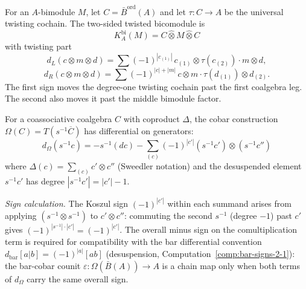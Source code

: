 \begin{computation}
\label{comp:two-sided-twisting-signs}
For an $A$-bimodule $M$, let $C=\bar B^{\mathrm{ord}}(A)$ and let
$\tau:C\to A$ be the universal twisting cochain. The two-sided twisted
bicomodule is
\[
K_A^{\mathrm{bi}}(M)=C\widehat\otimes M\widehat\otimes C
\]
with twisting part
\[
d_L(c\otimes m\otimes d)
=
\sum (-1)^{|c_{(1)}|}\,
c_{(1)}\otimes \tau(c_{(2)})\cdot m\otimes d,
\]
\[
d_R(c\otimes m\otimes d)
=
\sum (-1)^{|c|+|m|}\,
c\otimes m\cdot \tau(d_{(1)})\otimes d_{(2)}.
\]
The first sign moves the degree-one twisting cochain past the first
coalgebra leg. The second also moves it past the middle bimodule factor.
\end{computation}

\begin{computation}
\label{comp:cobar-signs-1-2}
For a coassociative coalgebra $C$ with coproduct $\Delta$, the cobar construction
$\Omega(C) = T(s^{-1}\overline{C})$ has differential on generators:
\[
d_\Omega(s^{-1}c) = -s^{-1}(dc) - \sum_{(c)} (-1)^{|c'|} (s^{-1}c') \otimes (s^{-1}c'')
\]
where $\Delta(c) = \sum_{(c)} c' \otimes c''$ (Sweedler notation) and the desuspended element $s^{-1}c'$ has degree $|s^{-1}c'| = |c'| - 1$.

\emph{Sign calculation.} The Koszul sign $(-1)^{|c'|}$ within each summand
arises from applying $(s^{-1} \otimes s^{-1})$ to $c' \otimes c''$: commuting
the second $s^{-1}$ (degree $-1$) past $c'$ gives $(-1)^{|s^{-1}|\cdot|c'|}
= (-1)^{|c'|}$. The overall minus sign on the comultiplication term is
required for compatibility with the bar differential convention
$d_{\mathrm{bar}}[a|b] = (-1)^{|a|}[ab]$ (desuspension, Computation~\ref{comp:bar-signs-2-1}):
the bar-cobar counit $\varepsilon\colon \Omega(\bar B(A)) \to A$ is a chain map
only when both terms of $d_\Omega$ carry the same overall sign.
\end{computation}

